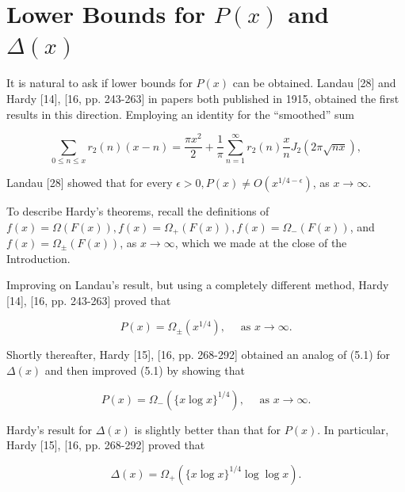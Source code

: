 \documentclass[10pt]{article}
\theoremstyle{plain}
\begin{document}
\section{Lower Bounds for \texorpdfstring{$P(x)$ and $\Delta(x)$}{P(x) and Delta(x)}}

It is natural to ask if lower bounds for $P(x)$ can be obtained. Landau [28] and Hardy [14], [16, pp. 243-263] in papers both published in 1915, obtained the first results in this direction. Employing an identity for the ``smoothed'' sum

$$
\sum_{0 \leq n \leq x} r_{2}(n)(x-n)=\frac{\pi x^{2}}{2}+\frac{1}{\pi} \sum_{n=1}^{\infty} r_{2}(n)\frac{x}{n} J_{2}(2 \pi \sqrt{n x}),
$$

Landau [28] showed that for every $\epsilon>0, P(x) \neq O\left(x^{1 / 4-\epsilon}\right)$, as $x \to \infty$.

To describe Hardy's theorems, recall the definitions of $f(x)=\Omega(F(x)), f(x)=\Omega_{+}(F(x)), f(x)=\Omega_{-}(F(x))$, and $f(x)=\Omega_{ \pm}(F(x))$, as $x \to \infty$, which we made at the close of the Introduction.

Improving on Landau's result, but using a completely different method, Hardy [14], [16, pp. 243-263] proved that


\begin{equation*}
P(x)=\Omega_{ \pm}\left(x^{1 / 4}\right), \quad \text { as } x \to \infty . \tag{5.1}
\end{equation*}


Shortly thereafter, Hardy [15], [16, pp. 268-292] obtained an analog of (5.1) for $\Delta(x)$ and then improved (5.1) by showing that


\begin{equation*}
P(x)=\Omega_{-}\left(\{x \log x\}^{1 / 4}\right), \quad \text { as } x \to \infty . \tag{5.2}
\end{equation*}


Hardy's result for $\Delta(x)$ is slightly better than that for $P(x)$. In particular, Hardy [15], [16, pp. 268-292] proved that


\begin{equation*}
\Delta(x)=\Omega_{+}\left(\{x \log x\}^{1 / 4} \log \log x\right) . \tag{5.3}
\end{equation*}
\end{document}

